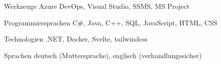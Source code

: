 
\begin{cvskills}
  \cvskill
  {Werkzeuge} %
  {Azure DevOps, Visual Studio, SSMS, MS Project} %

  \cvskill
  {Programmiersprachen} %
  {C\#, Java, C++, SQL, JavaScript, HTML, CSS} %

  \cvskill
  {Technologien} %
  {.NET, Docker, Svelte, tailwindcss} %

  \cvskill
  {Sprachen} %
  {deutsch (Muttersprache), englisch (verhandlungssicher)} %
\end{cvskills}
